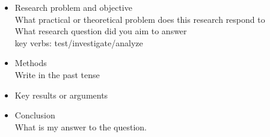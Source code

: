 \begin{itemize}
    \item
    Research problem and objective\\
    What practical or theoretical problem does this research respond to\\
    What research question did you aim to answer\\
    key verbs: test/investigate/analyze\\
    \item
    Methods\\
    Write in the past tense
    \item
    Key results or arguments
    \item
    Conclusion\\
    What is my answer to the question.
\end{itemize}